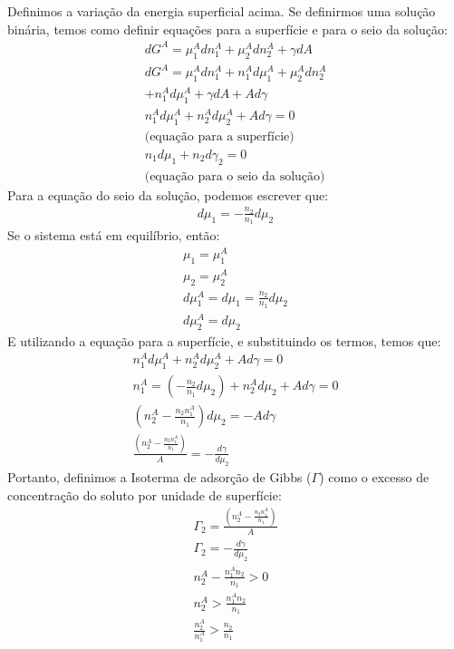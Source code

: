 \begin{multicols*}{2}
  \begin{definition}
    Definimos a variação da energia superficial acima. Se definirmos uma solução binária, temos como definir equações para a superfície e para o seio da solução:
    \begin{gather}
      dG^A = \mu_1^A dn_1^A + \mu_2^A dn_2^A + \gamma dA \\
      dG^A = \mu_1^A dn_1^A + n_1^A d\mu_1^A + \mu_2^A dn_2^A \\ + n_1^A d \mu_1^A + \gamma dA + A d \gamma \\
      n_1^A d \mu_1^A + n_2^A d \mu_2^A + A d\gamma = 0 \\ 
      \text{(equação para a superfície)} \\
      n_1 d\mu_1 + n_2 d \gamma_2 = 0 \\ 
      \text{(equação para o seio da solução)}
    \end{gather}    
    Para a equação do seio da solução, podemos escrever que:
    \begin{gather}
      d\mu_1 = - \frac{n_2}{n_1} d\mu_2
    \end{gather}
    Se o sistema está em equilíbrio, então:
    \begin{gather}
      \mu_1 = \mu_1^A \\
      \mu_2 = \mu_2^A \\
      d\mu_1^A = d \mu_1 = \frac{n_2}{n_1} d \mu_2 \\
      d\mu_2^A = d\mu_2
    \end{gather}
    E utilizando a equação para a superfície, e substituindo os termos, temos que:
    \begin{gather}
      n_1^A d \mu_1^A + n_2^A d \mu_2^A + A d\gamma = 0 \\ 
      n_1^A = \left( - \frac{n_2}{n_1} d\mu_2 \right) + n_2^A d \mu_2 + A d \gamma = 0 \\
      \left( n_2^A - \frac{n_2 n_1^A}{n_1} \right) d \mu_2 = - A d \gamma \\
      \frac{\left( n_2^A - \frac{n_2 n_1^A}{n_1} \right)}{A} = - \frac{d \gamma}{d \mu_2}
    \end{gather}
    Portanto, definimos a Isoterma de adsorção de Gibbs ($\Gamma$) como o excesso de concentração do soluto por unidade de superfície:
    \begin{gather}
      \Gamma_2 = \frac{\left( n_2^A - \frac{n_2 n_1^A}{n_1} \right)}{A} \\
      \Gamma_2 = - \frac{d\gamma}{d\mu_2} \\
      n_2^A - \frac{n_1^An_2}{n_1} > 0 \\
      n_2^A > \frac{n_1^A n_2}{n_1} \\
      \frac{n_2^A}{n_1^A} > \frac{n_2}{n_1}
    \end{gather}
  \end{definition}


\end{multicols*}
